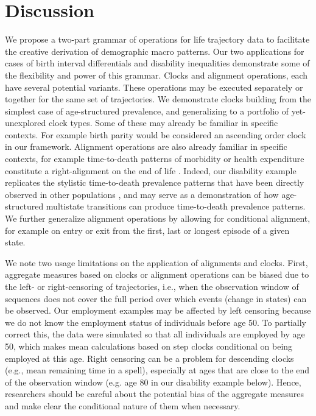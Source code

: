 \documentclass[a4paper,left=1.25cm,right=1.25cm,top=1.25cm,bottom=1.25cm]{article}
\begin{document}
\section{Discussion}

We propose a two-part grammar of operations for life trajectory data to facilitate the creative derivation of demographic macro patterns. Our two applications for cases of birth interval differentials and disability inequalities demonstrate some of the flexibility and power of this grammar. Clocks and alignment operations, each have several potential variants. These operations may be executed separately or together for the same set of trajectories. We demonstrate clocks building from the simplest case of age-structured prevalence, and generalizing to a portfolio of yet-unexplored clock types. Some of these may already be familiar in specific contexts. For example birth parity would be considered an ascending order clock in our framework. Alignment operations are also already familiar in specific contexts, for example time-to-death patterns of morbidity or health expenditure constitute a right-alignment on the end of life \citep{riffe2017unified, raab2018pathways, potente2018disability}. Indeed, our disability example replicates the stylistic time-to-death prevalence patterns that have been directly observed in other populations \citep{klijs2010disability, riffe2016time}, and may serve as a demonstration of how age-structured multistate transitions can produce time-to-death prevalence patterns. We further generalize alignment operations by allowing for conditional alignment, for example on entry or exit from the first, last or longest episode of a given state.

We note two usage limitations on the application of alignments and clocks. First, aggregate measures based on clocks or alignment operations can be biased due to the left- or right-censoring of trajectories, i.e., when the observation window of sequences does not cover the full period over which events (change in states) can be observed. Our employment examples may be affected by left censoring because we do not know the employment status of individuals before age 50. To partially correct this, the data were simulated so that all individuals are employed by age 50, which makes mean calculations based on step clocks conditional on being employed at this age. Right censoring can be a problem for descending clocks (e.g., mean remaining time in a spell), especially at ages that are close to the end of the observation window (e.g. age 80 in our disability example below). Hence, researchers should be careful about the potential bias of the aggregate measures and make clear the conditional nature of them when necessary.
\end{document}
